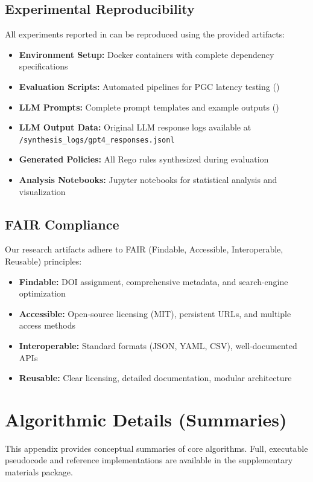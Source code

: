 \documentclass[sigconf,natbib]{acmart}
\begin{document}
\subsection{Experimental Reproducibility}
All experiments reported in  can be reproduced using the provided artifacts:
\begin{itemize}
    \item \textbf{Environment Setup:} Docker containers with complete dependency specifications
    \item \textbf{Evaluation Scripts:} Automated pipelines for PGC latency testing ()
    \item \textbf{LLM Prompts:} Complete prompt templates and example outputs ()
    \item \textbf{LLM Output Data:} Original LLM response logs available at \texttt{/synthesis\_logs/gpt4\_responses.jsonl}
    \item \textbf{Generated Policies:} All Rego rules synthesized during evaluation
    \item \textbf{Analysis Notebooks:} Jupyter notebooks for statistical analysis and visualization
\end{itemize}

\subsection{FAIR Compliance}
Our research artifacts adhere to FAIR (Findable, Accessible, Interoperable, Reusable) principles:
\begin{itemize}
    \item \textbf{Findable:} DOI assignment, comprehensive metadata, and search-engine optimization
    \item \textbf{Accessible:} Open-source licensing (MIT), persistent URLs, and multiple access methods
    \item \textbf{Interoperable:} Standard formats (JSON, YAML, CSV), well-documented APIs
    \item \textbf{Reusable:} Clear licensing, detailed documentation, modular architecture
\end{itemize}

\section{Algorithmic Details (Summaries)}
\label{app:algorithmic_details}
This appendix provides conceptual summaries of core algorithms. Full, executable pseudocode and reference implementations are available in the supplementary materials package.
\end{document}
